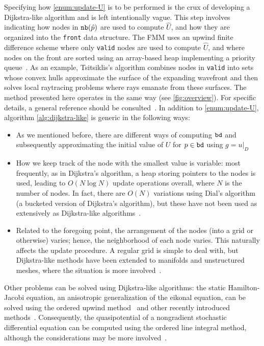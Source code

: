 \documentclass[eikonal.tex]{subfiles}
\begin{document}
Specifying how \cref{enum:update-U} is to be performed is the crux of
developing a Dijkstra-like algorithm and is left intentionally
vague. This step involves indicating how nodes in $\texttt{nb}(\hat{p})$ are
used to compute $\hat{U}$, and how they are organized into the
\texttt{front} data structure. The FMM uses an upwind finite
difference scheme where only \texttt{valid} nodes are used to compute
$\hat{U}$, and where nodes on the front are sorted using an
array-based heap implementing a priority
queue~\cite{sethian1996fast}. As an example, Tsitsiklis's algorithm
combines nodes in \texttt{valid} into sets whose convex hulls
approximate the surface of the expanding wavefront and then solves
local raytracing problems where rays emanate from these surfaces. The
method presented here operates in the same way (see
\cref{fig:overview}). For specific details, a general reference should
be consulted~\cite{sethian1999level}. In addition to
\cref{enum:update-U}, algorithm \cref{alg:dijkstra-like} is generic in
the following ways:
\begin{itemize}
\item As we mentioned before, there are different ways of computing
  $\texttt{bd}$ and subsequently approximating the initial value of $U$
  for $p \in \texttt{bd}$ using
  $g = \left. u \right|_D$~\cite{chopp2001some}
\item How we keep track of the node with the smallest value is
  variable: most frequently, as in Dijkstra's algorithm, a heap
  storing pointers to the nodes is used, leading to $O(N \log N)$
  update operations overall, where $N$ is the number of nodes. In
  fact, there are $O(N)$ variations using Dial's algorithm (a bucketed
  version of Dijkstra's algorithm), but these have not been used as
  extensively as Dijkstra-like
  algorithms~\cite{tsitsiklis1995efficient,kim2001calo,yatziv2006n}.
\item Related to the foregoing point, the arrangement of the nodes
  (into a grid or otherwise) varies; hence, the neighborhood of each
  node varies. This naturally affects the update procedure. A regular
  grid is simple to deal with, but Dijkstra-like methods have been
  extended to manifolds and unstructured meshes, where the situation
  is more
  involved~\cite{kimmel1998computing,sethian2000fast,bronstein2008numerical}.
\end{itemize}
Other problems can be solved using Dijkstra-like algorithms: the
static Hamilton-Jacobi equation, an anisotropic generalization of the
eikonal equation, can be solved using the ordered upwind
method~\cite{sethian2003ordered} and other recently introduced
methods~\cite{mirebeau2014efficient,mirebeau2014anisotropic}. Consequently,
the quasipotential of a nongradient stochastic differential equation
can be computed using the ordered line integral method, although the
considerations may be more
involved~\cite{dahiya2017ordered,dahiya2018ordered,yang2019computing}.
\end{document}
